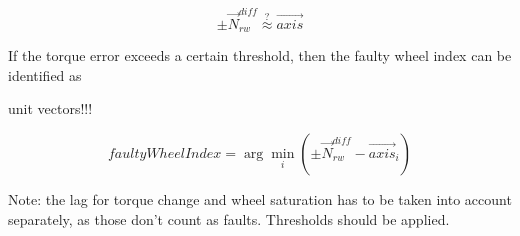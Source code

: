 \begin{equation}
 \pm \vec{N}_{rw}^{diff}  \stackrel{?}{\approx} \vec{axis} 
\end{equation}

If the torque error exceeds a certain threshold, then the faulty wheel index can be identified as

unit vectors!!!

\begin{equation}
faultyWheelIndex = \arg\min_i ( \pm \vec{N}_{rw}^{diff} - \vec{axis}_i ) 
\end{equation}


Note: the lag for torque change and wheel saturation has to be taken into account separately, as those don't count as faults. 
Thresholds should be applied.